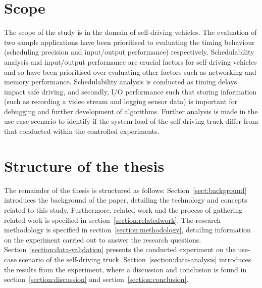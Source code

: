 \section{Scope}
The scope of the study is in the domain of self-driving vehicles. The evaluation of two sample applications have been prioritised to evaluating the timing behaviour (scheduling precision and input/output performance) respectively. Schedulability analysis and input/output performance are crucial factors for self-driving vehicles and so have been prioritised over evaluating other factors such as networking and memory performance. Schedulability analysis is conducted as timing delays impact safe driving, and secondly, I/O performance such that storing information (such as recording a video stream and logging sensor data) is important for debugging and further development of algorithms. Further analysis is made in the use-case scenario to identify if the system load of the self-driving truck differ from that conducted within the controlled experiments.



\section{Structure of the thesis}
The remainder of the thesis is structured as follows: Section~\ref{sect:background} introduces the background of the paper, detailing the technology and concepts related to this study. Furthermore, related work and the process of gathering related work is specified in section~\ref{section:relatedwork}. The research methodology is specified in section~\ref{section:methodology}, detailing information on the experiment carried out to answer the research questions. Section~\ref{section:data-validation} presents the conducted experiment on the use-case scenario of the self-driving truck. Section~\ref{section:data-analysis} introduces the results from the experiment, where a discussion and conclusion is found in section~\ref{section:discussion} and section~\ref{section:conclusion}.  


